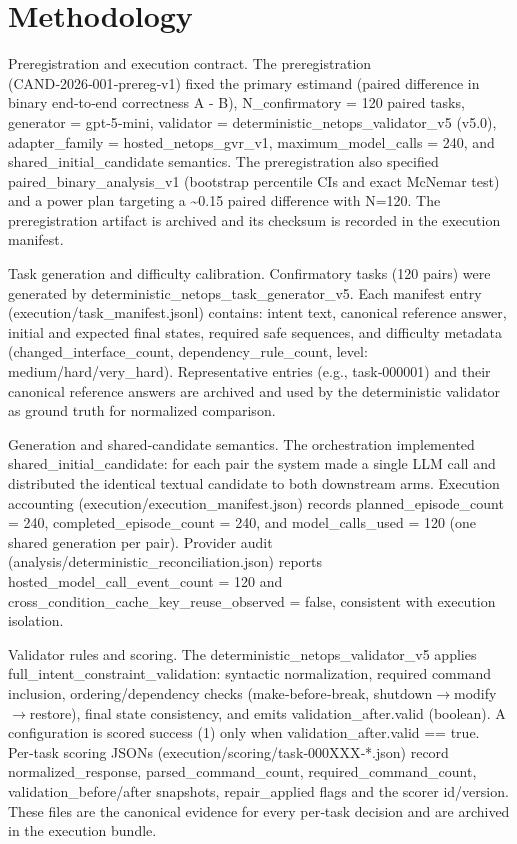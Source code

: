\documentclass[conference]{IEEEtran}
\begin{document}
\section{Methodology}
Preregistration and execution contract. The preregistration (CAND‑2026‑001‑prereg‑v1) fixed the primary estimand (paired difference in binary end‑to‑end correctness A - B), N\_confirmatory = 120 paired tasks, generator = gpt‑5‑mini, validator = deterministic\_netops\_validator\_v5 (v5.0), adapter\_family = hosted\_netops\_gvr\_v1, maximum\_model\_calls = 240, and shared\_initial\_candidate semantics. The preregistration also specified paired\_binary\_analysis\_v1 (bootstrap percentile CIs and exact McNemar test) and a power plan targeting a \textasciitilde{}0.15 paired difference with N=120. The preregistration artifact is archived and its checksum is recorded in the execution manifest.

Task generation and difficulty calibration. Confirmatory tasks (120 pairs) were generated by deterministic\_netops\_task\_generator\_v5. Each manifest entry (execution/task\_manifest.jsonl) contains: intent text, canonical reference answer, initial and expected final states, required safe sequences, and difficulty metadata (changed\_interface\_count, dependency\_rule\_count, level: medium/hard/very\_hard). Representative entries (e.g., task‑000001) and their canonical reference answers are archived and used by the deterministic validator as ground truth for normalized comparison.

Generation and shared‑candidate semantics. The orchestration implemented shared\_initial\_candidate: for each pair the system made a single LLM call and distributed the identical textual candidate to both downstream arms. Execution accounting (execution/execution\_manifest.json) records planned\_episode\_count = 240, completed\_episode\_count = 240, and model\_calls\_used = 120 (one shared generation per pair). Provider audit (analysis/deterministic\_reconciliation.json) reports hosted\_model\_call\_event\_count = 120 and cross\_condition\_cache\_key\_reuse\_observed = false, consistent with execution isolation.

Validator rules and scoring. The deterministic\_netops\_validator\_v5 applies full\_intent\_constraint\_validation: syntactic normalization, required command inclusion, ordering/dependency checks (make‑before‑break, shutdown\ensuremath{\rightarrow}modify\ensuremath{\rightarrow}restore), final state consistency, and emits validation\_after.valid (boolean). A configuration is scored success (1) only when validation\_after.valid == true. Per‑task scoring JSONs (execution/scoring/task‑000XXX‑*.json) record normalized\_response, parsed\_command\_count, required\_command\_count, validation\_before/after snapshots, repair\_applied flags and the scorer id/version. These files are the canonical evidence for every per‑task decision and are archived in the execution bundle.
\end{document}
